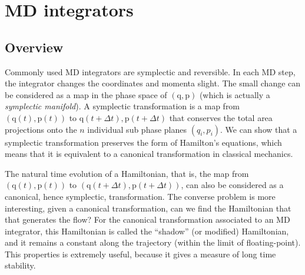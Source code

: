 \documentclass[aip,jcp,preprint,notitlepage, superscriptaddress]{revtex4-1}
\begin{document}
\newcommand{\vct}[1]{\bm{\mathrm{#1}}}
\newcommand{\vx}{\vct{x}}
\newcommand{\vy}{\vct{y}}
\newcommand{\Z}{\mathcal{Z}}
\newcommand{\E}{\mathcal{E}}
\newcommand{\Ham}{\mathcal{H}}
\newcommand{\W}{\mathcal{W}}
\newcommand{\A}{\mathcal{A}}

\newcommand{\repl}[2]{{\color{gray} [#1] }{\color{blue} #2}}
\newcommand{\add}[1]{{\color{blue} #1}}
\newcommand{\del}[1]{{\color{gray} [#1]}}
\newcommand{\note}[1]{{\color{OliveGreen}\small [\textbf{Comment.} #1]}}

\newcommand{\hl}[1]{{\color{red} #1}}




\section{MD integrators}


\subsection{Overview}



Commonly used MD integrators are symplectic and reversible.
%
In each MD step,
the integrator changes the coordinates and momenta slight.
%
The small change can be considered as a map
in the phase space of $(\vct q, \vct p)$
(which is actually a \emph{symplectic manifold}).
%
A symplectic transformation is a map
from $(\vct q(t), \vct p(t))$
to $\vct q(t + \Delta t), \vct p(t + \Delta t)$
that conserves the total area projections
onto the $n$ individual sub phase planes $(q_i, p_i)$.
%
We can show that a symplectic transformation
preserves the form of Hamilton's equations,
which means that it is equivalent to
a canonical transformation in classical mechanics.


The natural time evolution of a Hamiltonian,
that is, the map from $(\vct q(t), \vct p(t))$
to $(\vct q(t+\Delta t), \vct p(t+\Delta t))$,
can also be considered as a canonical, hence symplectic, transformation.
%
The converse problem is more interesting,
given a canonical transformation,
can we find the Hamiltonian that that generates the flow?
%
For the canonical transformation associated to an MD integrator,
this Hamiltonian is called the ``shadow''
(or modified) Hamiltonian,
and it remains a constant along the trajectory
(within the limit of floating-point).
%
This properties is extremely useful,
because it gives a measure of long time stability.
\end{document}
